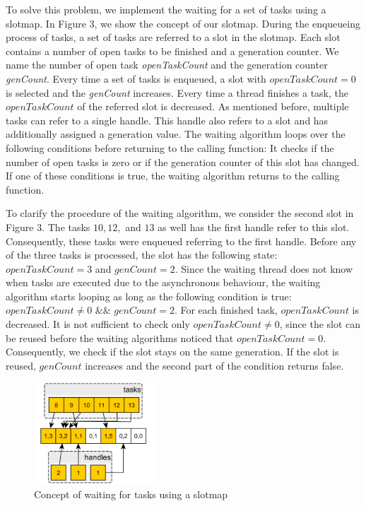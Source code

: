 \documentclass[conference]{IEEEtran}
\begin{document}
To solve this problem, we implement the waiting for a set of tasks using a slotmap. In Figure 3, we show the concept of our slotmap. During the enqueueing process of tasks, a set of tasks are referred to a slot in the slotmap. Each slot contains a number of open tasks to be finished and a generation counter. We name the number of open task \emph{openTaskCount} and the generation counter \emph{genCount}. Every time a set of tasks is enqueued, a slot with $openTaskCount = 0$ is selected and the \emph{genCount} increases. Every time a thread finishes a task, the $openTaskCount$ of the referred slot is decreased. As mentioned before, multiple tasks can refer to a single handle. This handle also refers to a slot and has additionally assigned a generation value. The waiting algorithm loops over the following conditions before returning to the calling function: It checks if the number of open tasks is zero or if the generation counter of this slot has changed. If one of these conditions is true, the waiting algorithm returns to the calling function.

To clarify the procedure of the waiting algorithm, we consider the second slot in Figure 3. The tasks $10, 12, $ and $13$ as well has the first handle refer to this slot. Consequently, these tasks were enqueued referring to the first handle. Before any of the three tasks is processed, the slot has the following state: $openTaskCount = 3$ and $genCount =  2$. Since the waiting thread does not know when tasks are executed due to the asynchronous behaviour, the waiting algorithm starts looping as long as the following condition is true: $openTaskCount \neq 0$ \&\& $genCount = 2$. For each finished task, $openTaskCount$ is decreased. It is not sufficient to check only $openTaskCount \neq 0$, since the slot can be reused before the waiting algorithms noticed that $openTaskCount = 0$. Consequently, we check if the slot stays on the same generation. If the slot is reused, $genCount$ increases and the second part of the condition returns false.

\begin{figure}
	\includegraphics[width=0.4\textwidth]{img/waitingconcept.png}
	\caption{Concept of waiting for tasks using a slotmap}
	\label{fig2}
\end{figure}
\end{document}
